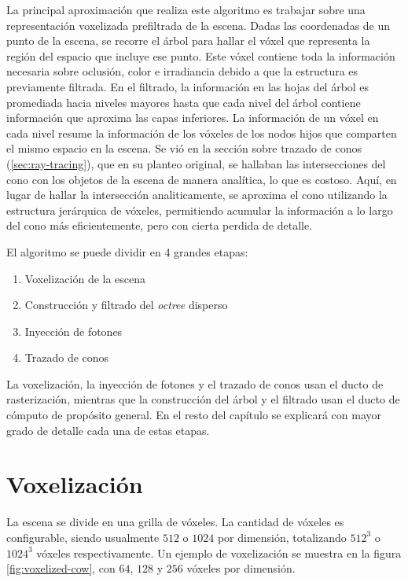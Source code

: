 La principal aproximación que realiza este algoritmo es trabajar sobre una representación voxelizada prefiltrada de la escena.
Dadas las coordenadas de un punto de la escena, se recorre el árbol para hallar el vóxel que representa la región del espacio que incluye ese punto.
Este vóxel contiene toda la información necesaria sobre oclusión, color e irradiancia debido a que la estructura es previamente filtrada.
En el filtrado, la información en las hojas del árbol es promediada hacia niveles mayores hasta que cada nivel del árbol contiene información que aproxima las capas inferiores.
La información de un vóxel en cada nivel resume la información de los vóxeles de los nodos hijos que comparten el mismo espacio en la escena.
Se vió en la sección sobre trazado de conos (\ref{sec:ray-tracing}), que en su planteo original, se hallaban las intersecciones del cono con los objetos de la escena de manera analítica, lo que es costoso.
Aquí, en lugar de hallar la intersección analiticamente, se aproxima el cono utilizando la estructura jerárquica de vóxeles, permitiendo acumular la información a lo largo del cono más eficientemente, pero con cierta perdida de detalle.

El algoritmo se puede dividir en 4 grandes etapas:

\begin{enumerate}
    \item Voxelización de la escena
    \item Construcción y filtrado del \textit{octree} disperso
    \item Inyección de fotones
    \item Trazado de conos
\end{enumerate}

La voxelización, la inyección de fotones y el trazado de conos usan el ducto de rasterización, mientras que la construcción del árbol y el filtrado usan el ducto de cómputo de propósito general.
En el resto del capítulo se explicará con mayor grado de detalle cada una de estas etapas.

\section{Voxelización}\label{sec:voxelization}

La escena se divide en una grilla de vóxeles.
La cantidad de vóxeles es configurable, siendo usualmente $512$ o $1024$ por dimensión, totalizando $512^3$ o $1024^3$ vóxeles respectivamente.
Un ejemplo de voxelización se muestra en la figura \ref{fig:voxelized-cow}, con $64$, $128$ y $256$ vóxeles por dimensión.

